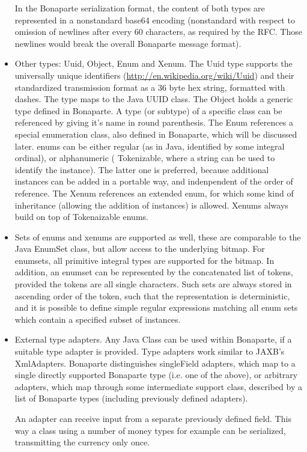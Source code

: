 \documentclass[11pt,a4paper,oneside]{article}
\begin{document}
\begin{itemize}
    In the Bonaparte serialization format, the content of both types are represented in a nonstandard base64 encoding (nonstandard with respect to omission of
    newlines after every 60 characters, as required by the RFC. Those newlines would break the overall Bonaparte message format).
  \item Other types: {\ttfamily Uuid}, {\ttfamily Object}, {\ttfamily Enum} and {\ttfamily Xenum}. The
  {\ttfamily Uuid} type supports the universally unique identifiers (\url{http://en.wikipedia.org/wiki/Uuid}) and their standardized transmission format as a 36 byte hex string, formatted with dashes.
   The type maps to the Java UUID class. The {\ttfamily Object} holds a generic type defined in Bonaparte. A type (or subtype) of a specific class can be
    referenced by giving it's name in round parenthesis.  
   The {\ttfamily Enum} references a special enumeration class, also defined in Bonaparte, which will be discussed later.
   {\ttfamily enum}s can be either regular (as in Java, identified by some integral ordinal), or alphanumeric ({\ttfamily
   Tokenizable}, where a string can be used to identify the instance). The latter one is preferred, because additional instances
   can be added in a portable way, and indenpendent of the order of reference. The {\ttfamily Xenum} references an extended
   enum, for which some kind of inheritance (allowing the addition of instances) is allowed. {\ttfamily Xenum}s always build on
   top of {\ttfamily Tokenaizable} {\ttfamily enum}s.
   \item Sets of enums and xenums are supported as well, these are comparable to the Java {\ttfamily EnumSet} class, but allow
   access to the underlying bitmap. For {\ttfamily enumset}s, all primitive integral types are supported for the bitmap. In
   addition, an {\ttfamily enumset} can be represented by the concatenated list of tokens, provided the tokens are all single
   characters. Such sets are always stored in ascending order of the token, such that the representation is deterministic, and
   it is possible to define simple regular expressions matching all enum sets which contain a specified subset of instances. 
   \item External type adapters. Any Java Class can be used within Bonaparte, if a suitable type adapter is provided. Type
   adapters work similar to JAXB's {\ttfamily XmlAdapter}s. Bonaparte distinguishes {\ttfamily singleField} adapters, which map
   to a single directly supported Bonaparte type (i.e. one of the above), or arbitrary adapters, which map through some
   intermediate support class, described by a list of Bonaparte types (including previously defined adapters).
   
   An adapter can receive input from a separate previously defined field. This way a class using a number of money types for
   example can be serialized, transmitting the currency only once.
\end{itemize}
\end{document}
